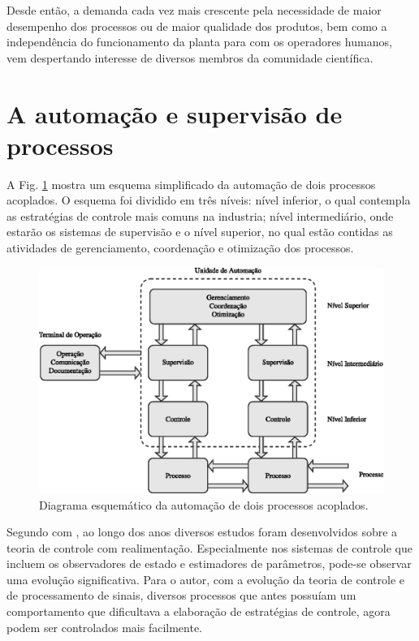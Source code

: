 
Desde então, a demanda cada vez mais crescente pela necessidade de maior
desempenho dos processos ou de maior qualidade dos produtos, bem como a
independência do funcionamento da planta para com os operadores humanos, vem
despertando interesse de diversos membros da comunidade científica.


\section{A automação e supervisão de processos}
A Fig. \ref{fig:esquema_automacao} mostra um esquema simplificado da automação
de dois processos acoplados. O esquema foi dividido em três níveis: nível
inferior, o qual contempla as estratégias de controle mais comuns na industria;
nível intermediário, onde estarão os sistemas de supervisão e o nível superior,
no qual estão contidas as atividades de gerenciamento, coordenação e otimização
dos processos.

\begin{figure}[!htb]
\centering
    \includegraphics{imgs/introducao/eps/esquema_automacao}
    \caption{Diagrama esquemático da automação de dois processos acoplados.}
    \label{fig:esquema_automacao}
\end{figure}

Segundo com , ao longo dos anos diversos estudos foram
desenvolvidos sobre a teoria de controle com realimentação.  Especialmente nos
sistemas de controle que incluem os observadores de estado e estimadores de
parâmetros, pode-se observar uma evolução significativa. Para o autor, com a
evolução da teoria de controle e de processamento de sinais, diversos processos
que antes possuíam um comportamento que dificultava a elaboração de estratégias
de controle, agora podem ser controlados mais facilmente.

